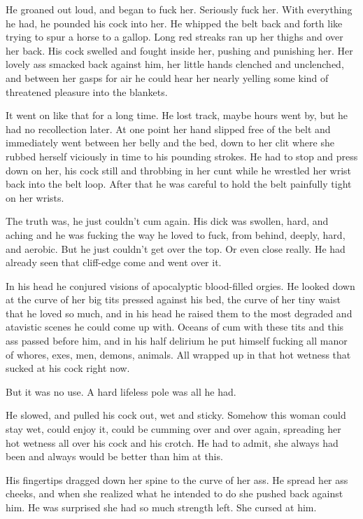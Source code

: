 \documentclass[letterpaper]{article}
\begin{document}
He groaned out loud, and began to fuck her. Seriously fuck her.
With everything he had, he pounded his cock into her. 
He whipped the belt back and forth like trying to spur a horse to a gallop. Long red streaks ran up her thighs and over her back. His cock swelled and fought inside her, pushing and punishing her.
Her lovely ass smacked back against him, her little hands clenched and unclenched, and between her gasps for air he could hear her nearly yelling some kind of threatened pleasure into the blankets.

It went on like that for a long time. He lost track, maybe hours went by, but he had no recollection later. At one point her hand slipped free of the belt and immediately went between her belly and the bed, down to her clit where she rubbed herself viciously in time to his pounding strokes. 
He had to stop and press down on her, his cock still and throbbing in her cunt while he wrestled her wrist back into the belt loop. 
After that he was careful to hold the belt painfully tight on her wrists.

The truth was, he just couldn't cum again. His dick was swollen, hard, and aching and he was fucking the way he loved to fuck, from behind, deeply, hard, and aerobic. 
But he just couldn't get over the top. Or even close really.
He had already seen that cliff-edge come and went over it.

In his head he conjured visions of apocalyptic blood-filled orgies. 
He looked down at the curve of her big tits pressed against his bed, the curve of her tiny waist that he loved so much, and in his head he raised them to the most degraded and atavistic scenes he could come up with. 
Oceans of cum with these tits and this ass passed before him, and in his half delirium he put himself fucking all manor of whores, exes, men, demons, animals.
All wrapped up in that hot wetness that sucked at his cock right now.

But it was no use. A hard lifeless pole was all he had.

He slowed, and pulled his cock out, wet and sticky. Somehow this woman could stay wet, could enjoy it, could be cumming over and over again, spreading her hot wetness all over his cock and his crotch.
He had to admit, she always had been and always would be better than him at this.

His fingertips dragged down her spine to the curve of her ass.
He spread her ass cheeks, and when she realized what he intended to do she pushed back against him.
He was surprised she had so much strength left.
She cursed at him.
\end{document}
